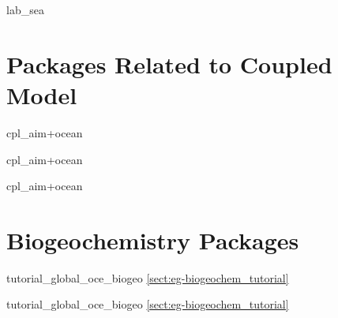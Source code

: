 \newpage

lab\_sea

\section{Packages Related to Coupled Model}
\newpage

cpl\_aim+ocean

\newpage

cpl\_aim+ocean

\newpage

cpl\_aim+ocean

\section{Biogeochemistry Packages}
\newpage

tutorial\_global\_oce\_biogeo    \ref{sect:eg-biogeochem_tutorial}

\newpage

tutorial\_global\_oce\_biogeo    \ref{sect:eg-biogeochem_tutorial}
